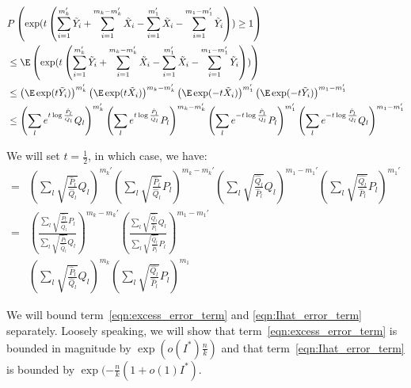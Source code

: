 \documentclass{article}
\begin{document}
\begin{align*}
& P \left( \exp( t \left( \sum_{i=1}^{m_k'} \tilde{Y}_i + \sum_{i=1}^{m_k - m_k'} \tilde{X}_i- 
     \sum_{i=1}^{m_1'}  \tilde{X}_i - \sum_{i=1}^{m_1 - m_1'} \tilde{Y}_i  \right) ) \geq 1 \right) \\ 
&\leq \E \left( 
\exp( t \left( \sum_{i=1}^{m_k'} \tilde{Y}_i + \sum_{i=1}^{m_k - m_k'} \tilde{X}_i - 
     \sum_{i=1}^{m_1'}  \tilde{X}_i - \sum_{i=1}^{m_1 - m_1'} \tilde{Y}_i  \right) )
 \right) \\ 
&\leq \left( \E \exp( t \tilde{Y}_i ) \right)^{m_k'} 
      \left( \E \exp(t \tilde{X}_i ) \right)^{m_k - m_k'}  
    \left( \E \exp( - t \tilde{X}_i) \right)^{m_1'} 
    \left( \E \exp( -t \tilde{Y}_i ) \right)^{m_1 - m_1'} \\
&\leq \left( \sum_l e^{t \log \frac{\hat{P}_l}{\hat{Q}_l} } Q_l \right)^{m_k'}  
      \left( \sum_l e^{t \log \frac{\hat{P}_l}{\hat{Q}_l}} P_l \right)^{m_k - m_k'} 
      \left( \sum_l e^{- t \log \frac{\hat{P}_l}{\hat{Q_l}} } P_l \right)^{m_1'}
     \left( \sum_l e^{-t \log \frac{\hat{P}_l}{\hat{Q}_l}} Q_l \right)^{m_1 - m_1'}
\end{align*}

We will set $t = \frac{1}{2}$, in which case, we have:
\begin{align}
=& \left( \sum_l \sqrt{\frac{\hat{P}_l}{\hat{Q}_l} } Q_l \right)^{m_k'}
 \left( \sum_l \sqrt{\frac{\hat{P}_l}{\hat{Q}_l} } P_l \right)^{m_k - m_k'}
 \left( \sum_l \sqrt{\frac{\hat{Q}_l}{\hat{P}_l} } Q_l \right)^{m_1 - m_1'}
       \left( \sum_l \sqrt{\frac{\hat{Q_l}}{\hat{P}_l} } P_l \right)^{m_1'} \nonumber \\
=&  \left( \frac{\sum_l \sqrt{\frac{\hat{P}_l}{\hat{Q}_l} } P_l}
                {\sum_l \sqrt{\frac{\hat{P}_l}{\hat{Q}_l} } Q_l}  \right)^{m_k - m_k'}
 \left( \frac{ \sum_l \sqrt{\frac{\hat{Q}_l}{\hat{P}_l} } Q_l}
             { \sum_l \sqrt{\frac{\hat{Q}_l}{\hat{P}_l} } P_l} \right)^{m_1 - m_1'}  
   \label{eqn:excess_error_term} \\
 & \left( \sum_l \sqrt{ \frac{\hat{P}_l}{\hat{Q}_l}} Q_l \right)^{m_k} 
    \left( \sum_l \sqrt{\frac{\hat{Q_l}}{\hat{P}_l} } P_l \right)^{m_1}
   \label{eqn:Ihat_error_term} 
\end{align} 

We will bound term~\ref{eqn:excess_error_term} and \ref{eqn:Ihat_error_term} separately. Loosely speaking, we will show that term~\ref{eqn:excess_error_term} is bounded in magnitude by $\exp( o(I^*) \frac{n}{k} )$ and that term~\ref{eqn:Ihat_error_term} is bounded by $\exp( - \frac{n}{k} (1 + o(1) I^*)$. 
\end{document}
